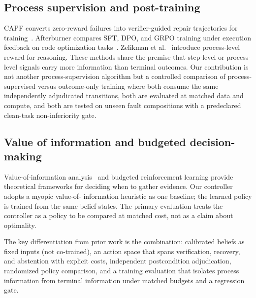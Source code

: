 \subsection{Process supervision and post-training}

CAPF converts zero-reward failures into verifier-guided repair trajectories
for training~\citep{capf2026}. Afterburner compares SFT, DPO, and GRPO
training under execution feedback on code optimization tasks~\citep{afterburner2025}.
Zelikman et al.~\citep{zelikman2022} introduce process-level reward for
reasoning. These methods share the premise that step-level or process-level
signals carry more information than terminal outcomes. Our contribution is
not another process-supervision algorithm but a controlled comparison of
process-supervised versus outcome-only training where both consume the same
independently adjudicated transitions, both are evaluated at matched data
and compute, and both are tested on unseen fault compositions with a
predeclared clean-task non-inferiority gate.

\subsection{Value of information and budgeted decision-making}

Value-of-information analysis~\citep{howard1966} and budgeted
reinforcement learning provide theoretical frameworks for deciding
when to gather evidence. Our controller adopts a myopic value-of-
information heuristic as one baseline; the learned policy is trained
from the same belief states. The primary evaluation treats the controller
as a policy to be compared at matched cost, not as a claim about optimality.

The key differentiation from prior work is the combination: calibrated
beliefs as fixed inputs (not co-trained), an action space that spans
verification, recovery, and abstention with explicit costs, independent
postcondition adjudication, randomized policy comparison, and a training
evaluation that isolates process information from terminal information
under matched budgets and a regression gate.
